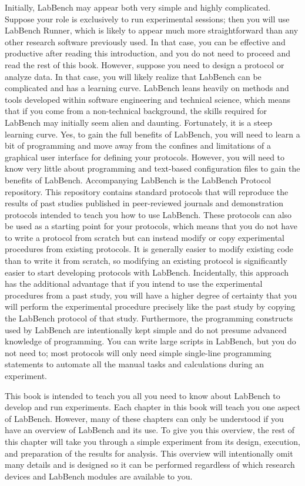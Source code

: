 Initially, LabBench may appear both very simple and highly complicated. Suppose your role is exclusively to run experimental sessions; then you will use LabBench Runner, which is likely to appear much more straightforward than any other research software previously used. In that case, you can be effective and productive after reading this introduction, and you do not need to proceed and read the rest of this book. However, suppose you need to design a protocol or analyze data. In that case, you will likely realize that LabBench can be complicated and has a learning curve. LabBench leans heavily on methods and tools developed within software engineering and technical science, which means that if you come from a non-technical background, the skills required for LabBench may initially seem alien and daunting. Fortunately, it is a steep learning curve. Yes, to gain the full benefits of LabBench, you will need to learn a bit of programming and move away from the confines and limitations of a graphical user interface for defining your protocols. However, you will need to know very little about programming and text-based configuration files to gain the benefits of LabBench. Accompanying LabBench is the LabBench Protocol repository. This repository contains standard protocols that will reproduce the results of past studies published in peer-reviewed journals and demonstration protocols intended to teach you how to use LabBench. These protocols can also be used as a starting point for your protocols, which means that you do not have to write a protocol from scratch but can instead modify or copy experimental procedures from existing protocols. It is generally easier to modify existing code than to write it from scratch, so modifying an existing protocol is significantly easier to start developing protocols with LabBench. Incidentally, this approach has the additional advantage that if you intend to use the experimental procedures from a past study, you will have a higher degree of certainty that you will perform the experimental procedure precisely like the past study by copying the LabBench protocol of that study. Furthermore, the programming constructs used by LabBench are intentionally kept simple and do not presume advanced knowledge of programming. You can write large scripts in LabBench, but you do not need to; most protocols will only need simple single-line programming statements to automate all the manual tasks and calculations during an experiment.

This book is intended to teach you all you need to know about LabBench to develop and run experiments. Each chapter in this book will teach you one aspect of LabBench. However, many of these chapters can only be understood if you have an overview of LabBench and its use. To give you this overview, the rest of this chapter will take you through a simple experiment from its design, execution, and preparation of the results for analysis. This overview will intentionally omit many details and is designed so it can be performed regardless of which research devices and LabBench modules are available to you.

